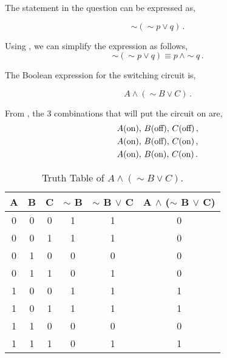 \begin{subquestions}
\begin{subsubquestions}
The statement in the question can be expressed as,

\begin{equation}
	\sim(\sim p \lor q)\,.
\end{equation}


\subsubquestion

Using , we can simplify the expression as follows,
\begin{equation}
		\sim(\sim p \lor q) \equiv p \, \land \sim q\,.
\end{equation}

\end{subsubquestions}


\subquestion

\begin{subsubquestions}

\subsubquestion
The Boolean expression for the switching circuit is,

\begin{equation}
	A \land (\sim B \lor C)\,.
\end{equation}


\subsubquestion

From , the 3 combinations that will put the circuit on are,
\begin{align}
	& A (\text{on}),\, B (\text{off}),\, C (\text{off})\,, \nonumber \\
	& A (\text{on}),\, B (\text{off}),\, C (\text{on})\,, \nonumber \\
	& A (\text{on}),\, B (\text{on}),\, C (\text{on})\,.
\end{align}

\begin{table}[H]
	\centering
	\begin{tabular}{|c|c|c|c|c|c|}
		\hline
		A & B & C & $\sim$ B & $\sim$ B $\lor$ C & A $\land$ ($\sim$ B $\lor$ C) \\
		\hline
		0 & 0 & 0 & 1 & 1 & 0 \\
		0 & 0 & 1 & 1 & 1 & 0 \\
		0 & 1 & 0 & 0 & 0 & 0 \\
		0 & 1 & 1 & 0 & 1 & 0 \\
		1 & 0 & 0 & 1 & 1 & 1 \\
		1 & 0 & 1 & 1 & 1 & 1 \\
		1 & 1 & 0 & 0 & 0 & 0 \\
		1 & 1 & 1 & 0 & 1 & 1 \\
		\hline
	\end{tabular}
	\caption{\label{2012:q2:TruthTab3} Truth Table of $A \land (\sim B \lor C)$.}
\end{table}


\end{subsubquestions}
\end{subquestions}
